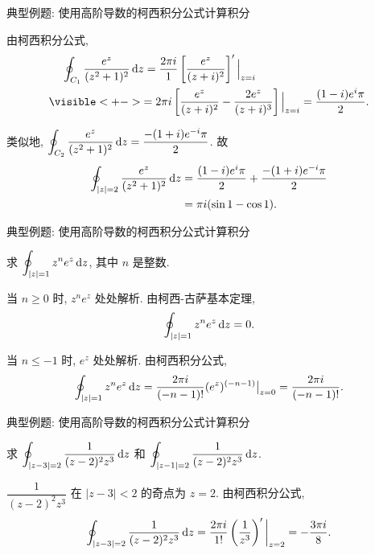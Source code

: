 \begin{frame}{典型例题: 使用高阶导数的柯西积分公式计算积分}
\begin{solutionc}
由柯西积分公式,
\begin{align*}
&\peq\oint_{C_1}\frac{e^z}{(z^2+1)^2}\diff z
=\frac{2\pi i}{1}\left[\frac{e^z}{(z+i)^2}\right]'\Big|_{z=i}\\
&\visible<+->{=2\pi i\left[\frac{e^z}{(z+i)^2}-\frac{2e^z}{(z+i)^3}\right]\Big|_{z=i}
=\frac{(1-i)e^i\pi}2.}
\end{align*}
\onslide<+->

类似地, $\displaystyle\oint_{C_2}\frac{e^z}{(z^2+1)^2}\,\mathrm{d} z=\frac{-(1+i)e^{-i}\pi}2$.
\onslide<+->
故
\begin{align*}
\oint_{|z|=2}\frac{e^z}{(z^2+1)^2}\,\mathrm{d} z
&=\frac{(1-i)e^i\pi}2+\frac{-(1+i)e^{-i}\pi}2\\
&=\pi i(\sin1-\cos1).
\end{align*}
\vspace{-20pt}
\end{solutionc}
\end{frame}


\begin{frame}{典型例题: 使用高阶导数的柯西积分公式计算积分}
\begin{example}
求 $\displaystyle\oint_{|z|=1}z^ne^z\,\mathrm{d} z$, 其中 $n$ 是整数.
\end{example}
\begin{solution}
当 $n\ge 0$ 时, $z^ne^z$ 处处解析.
\onslide<+->
由柯西-古萨基本定理, 
\[\oint_{|z|=1}z^ne^z\,\mathrm{d} z=0.\]

\onslide<+->
当 $n\le-1$ 时, $e^z$ 处处解析.
\onslide<+->
由柯西积分公式,
\[\oint_{|z|=1}z^ne^z\,\mathrm{d} z
=\frac{2\pi i}{(-n-1)!}(e^z)^{(-n-1)}\big|_{z=0}
=\frac{2\pi i}{(-n-1)!}.\]
\end{solution}
\end{frame}


\begin{frame}{典型例题: 使用高阶导数的柯西积分公式计算积分}
\begin{example}
求 $\displaystyle\oint_{|z-3|=2}\frac1{(z-2)^2z^3}\,\mathrm{d} z$ 和 $\displaystyle\oint_{|z-1|=2}\frac1{(z-2)^2z^3}\,\mathrm{d} z$.
\end{example}
\begin{solution}
 $\dfrac1{(z-2)^2z^3}$ 在 $|z-3|<2$ 的奇点为 $z=2$.
\onslide<+->
由柯西积分公式,
\[\oint_{|z-3|=2}\frac1{(z-2)^2z^3}\,\mathrm{d} z
	=\frac{2\pi i}{1!}\left(\frac1{z^3}\right)'\bigg|_{z=2}
	=-\frac{3\pi i}8.\]
\end{solution}
\end{frame}


